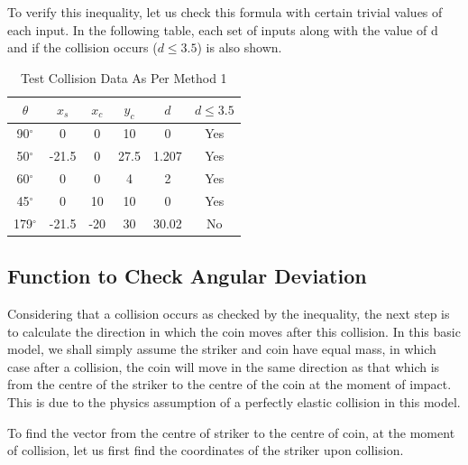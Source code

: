 \documentclass[10pt]{article}
\begin{document}
To verify this inequality, let us check this formula with certain trivial values of each input. In the following table, each set of inputs along with the value of d and if the collision occurs ($d \leq 3.5$) is also shown.

\begin{table}[h]
    \centering
    \begin{tabular}{cccccc}
        \hline
        $\theta$ & $x_s$ & $x_c$ & $y_c$ & $d$ & $d \leq 3.5$ \\
        \hline
        90$^{\circ}$ & 0 & 0 & 10 & 0 & Yes \\
        50$^{\circ}$ & -21.5 & 0 & 27.5 & 1.207 & Yes \\
        60$^{\circ}$ & 0 & 0 & 4 & 2 & Yes \\
        45$^{\circ}$ & 0 & 10 & 10 & 0 & Yes \\
        179$^{\circ}$ & -21.5 & -20 & 30 & 30.02 & No \\
        \hline
    \end{tabular}
    \caption{Test Collision Data As Per Method 1}
    \label{tab:collision_data}
\end{table}

\subsection{Function to Check Angular Deviation}
Considering that a collision occurs as checked by the inequality, the next step is to calculate the direction in which the coin moves after this collision. In this basic model, we shall simply assume the striker and coin have equal mass, in which case after a collision, the coin will move in the same direction as that which is from the centre of the striker to the centre of the coin at the moment of impact. This is due to the physics assumption of a perfectly elastic collision in this model. 

To find the vector from the centre of striker to the centre of coin, at the moment of collision, let us first find the coordinates of the striker upon collision.
\end{document}
